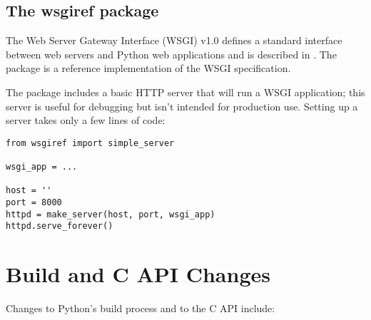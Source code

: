 \documentclass{howto}
\begin{document}
\subsection{The wsgiref package\label{module-wsgiref}}


The Web Server Gateway Interface (WSGI) v1.0 defines a standard
interface between web servers and Python web applications and is
described in .  The  package is a reference
implementation of the WSGI specification.

The package includes a basic HTTP server that will run a WSGI
application; this server is useful for debugging but isn't intended for 
production use.  Setting up a server takes only a few lines of code:

\begin{verbatim}
from wsgiref import simple_server

wsgi_app = ...

host = ''
port = 8000
httpd = make_server(host, port, wsgi_app)
httpd.serve_forever()
\end{verbatim}


\begin{seealso}



\end{seealso}


\section{Build and C API Changes\label{build-api}}

Changes to Python's build process and to the C API include:
\end{document}
